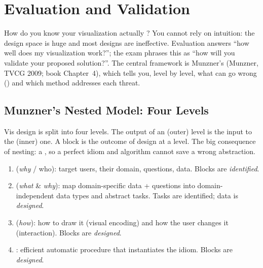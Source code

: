 \section{Evaluation and Validation}

How do you know your visualization actually ? You
cannot rely on intuition: the design space is huge and most designs are
ineffective. Evaluation answers ``how well does my visualization work?''; the
exam phrases this as ``how will you validate your proposed solution?''. The
central framework is Munzner's  (Munzner, TVCG 2009; book
Chapter~4), which tells you, level by level, what can go wrong ()
and which method addresses each threat.

\subsection{Munzner's Nested Model: Four Levels}

Vis design is split into four  levels. The output of an
 (outer) level is the input to the  (inner) one.
A block is the outcome of design at a level. The big consequence of nesting: a
, so a
perfect idiom and algorithm cannot save a wrong abstraction.

\begin{keybox}
\begin{enumerate}[label=\arabic*.]
  \item {} (\emph{why} / who): target users, their domain,
        questions, data. Blocks are \emph{identified}.
  \item {} (\emph{what} \& \emph{why}): map
        domain-specific data + questions into domain-independent data types and
        abstract tasks. Tasks are identified; data is \emph{designed}.
  \item {} (\emph{how}): how to draw it
        (visual encoding) and how the user changes it (interaction). Blocks are
        \emph{designed}.
  \item {}: efficient automatic procedure that instantiates the
        idiom. Blocks are \emph{designed}.
\end{enumerate}
\end{keybox}

